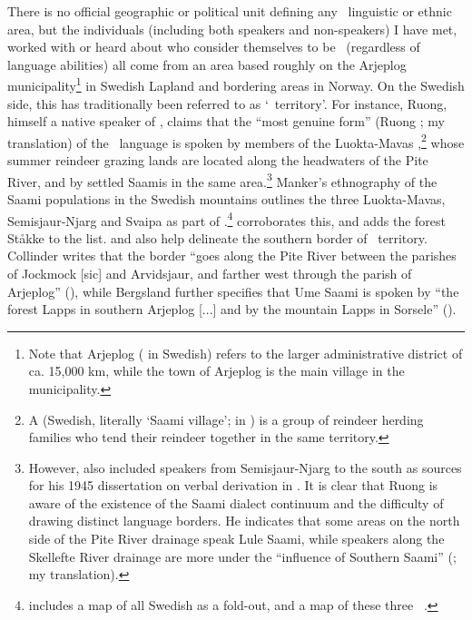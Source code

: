 There is no official geographic or political unit defining any \PS\ linguistic or ethnic area, but the individuals (including both speakers and non-speakers) I have met, worked with or heard about who consider themselves to be \PS\ (regardless of language abilities) all come from an area based roughly on the Arjeplog municipality\footnote{Note that Arjeplog  ( in Swedish) refers to the larger administrative district of ca. 15,000 km, while the town of Arjeplog is the main village in the municipality.} 
in Swedish Lapland and bordering areas in Norway. On the Swedish side, this has traditionally been referred to as  ‘\PS\ territory’. 
For instance, Ruong, himself a native speaker of \PS, claims that the “most genuine form” (Ruong \citeyear[iii]{Ruong1943}; my translation) of the \PS\ language is spoken by members of the Luokta-Mavas ,\footnote{A  (Swedish, literally ‘Saami village’;  in \PL) is a group of reindeer herding families who tend their reindeer together in the same territory.} 
whose summer reindeer grazing lands are located along the headwaters of the Pite River, and by settled Saamis in the same area.\footnote{However, \citeauthor{Ruong1945} also included speakers from Semisjaur-Njarg  to the south as sources for his 1945 dissertation on verbal derivation in \PS. It is clear that Ruong is aware of the existence of the Saami dialect continuum and the difficulty of drawing distinct language borders. He indicates that some areas on the north side of the Pite River drainage speak Lule Saami, while speakers along the Skellefte River drainage are more under the “influence of Southern Saami” (\citealt[iii]{Ruong1945}; my translation).} 
Manker’s ethnography of the Saami populations in the Swedish mountains \citep{Manker1947} outlines the three  Luokta-Mavas, Semisjaur-Njarg and Svaipa as part of .\footnote{\citet[473]{Manker1947} includes a map of all Swedish  as a fold-out, and a map of these three \PS\ .} 
\citet[22]{Sammallahti1998} corroborates this, and adds the forest  Ståkke to the list. \citeauthor{Collinder1960} and \citeauthor{Bergsland1962} also help delineate the southern border of \PS\ territory. Collinder writes that the border “goes along the Pite River between the parishes of Jockmock [sic] and Arvidsjaur, and farther west through the parish of Arjeplog” (\citeyear[23]{Collinder1960}), while Bergsland further specifies that Ume Saami is spoken by “the forest Lapps in southern Arjeplog [...] and by the mountain Lapps in Sorsele” (\citeyear[27]{Bergsland1962}). %

